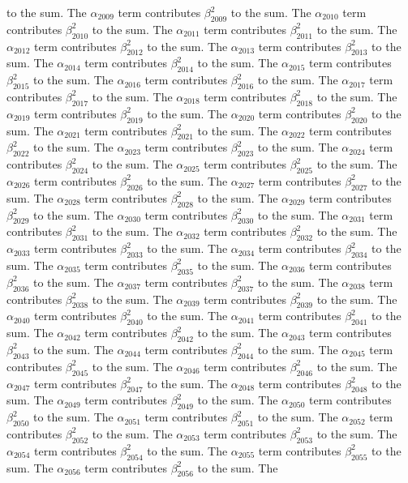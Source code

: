\begin{lemma}
to the sum. The $\alpha_{2009}$ term contributes $\beta_{2009}^{2}$ to the sum. The $\alpha_{2010}$ term contributes $\beta_{2010}^{2}$ to the sum. The $\alpha_{2011}$ term contributes $\beta_{2011}^{2}$ to the sum. The $\alpha_{2012}$ term contributes $\beta_{2012}^{2}$ to the sum. The $\alpha_{2013}$ term contributes $\beta_{2013}^{2}$ to the sum. The $\alpha_{2014}$ term contributes $\beta_{2014}^{2}$ to the sum. The $\alpha_{2015}$ term contributes $\beta_{2015}^{2}$ to the sum. The $\alpha_{2016}$ term contributes $\beta_{2016}^{2}$ to the sum. The $\alpha_{2017}$ term contributes $\beta_{2017}^{2}$ to the sum. The $\alpha_{2018}$ term contributes $\beta_{2018}^{2}$ to the sum. The $\alpha_{2019}$ term contributes $\beta_{2019}^{2}$ to the sum. The $\alpha_{2020}$ term contributes $\beta_{2020}^{2}$ to the sum. The $\alpha_{2021}$ term contributes $\beta_{2021}^{2}$ to the sum. The $\alpha_{2022}$ term contributes $\beta_{2022}^{2}$ to the sum. The $\alpha_{2023}$ term contributes $\beta_{2023}^{2}$ to the sum. The $\alpha_{2024}$ term contributes $\beta_{2024}^{2}$ to the sum. The $\alpha_{2025}$ term contributes $\beta_{2025}^{2}$ to the sum. The $\alpha_{2026}$ term contributes $\beta_{2026}^{2}$ to the sum. The $\alpha_{2027}$ term contributes $\beta_{2027}^{2}$ to the sum. The $\alpha_{2028}$ term contributes $\beta_{2028}^{2}$ to the sum. The $\alpha_{2029}$ term contributes $\beta_{2029}^{2}$ to the sum. The $\alpha_{2030}$ term contributes $\beta_{2030}^{2}$ to the sum. The $\alpha_{2031}$ term contributes $\beta_{2031}^{2}$ to the sum. The $\alpha_{2032}$ term contributes $\beta_{2032}^{2}$ to the sum. The $\alpha_{2033}$ term contributes $\beta_{2033}^{2}$ to the sum. The $\alpha_{2034}$ term contributes $\beta_{2034}^{2}$ to the sum. The $\alpha_{2035}$ term contributes $\beta_{2035}^{2}$ to the sum. The $\alpha_{2036}$ term contributes $\beta_{2036}^{2}$ to the sum. The $\alpha_{2037}$ term contributes $\beta_{2037}^{2}$ to the sum. The $\alpha_{2038}$ term contributes $\beta_{2038}^{2}$ to the sum. The $\alpha_{2039}$ term contributes $\beta_{2039}^{2}$ to the sum. The $\alpha_{2040}$ term contributes $\beta_{2040}^{2}$ to the sum. The $\alpha_{2041}$ term contributes $\beta_{2041}^{2}$ to the sum. The $\alpha_{2042}$ term contributes $\beta_{2042}^{2}$ to the sum. The $\alpha_{2043}$ term contributes $\beta_{2043}^{2}$ to the sum. The $\alpha_{2044}$ term contributes $\beta_{2044}^{2}$ to the sum. The $\alpha_{2045}$ term contributes $\beta_{2045}^{2}$ to the sum. The $\alpha_{2046}$ term contributes $\beta_{2046}^{2}$ to the sum. The $\alpha_{2047}$ term contributes $\beta_{2047}^{2}$ to the sum. The $\alpha_{2048}$ term contributes $\beta_{2048}^{2}$ to the sum. The $\alpha_{2049}$ term contributes $\beta_{2049}^{2}$ to the sum. The $\alpha_{2050}$ term contributes $\beta_{2050}^{2}$ to the sum. The $\alpha_{2051}$ term contributes $\beta_{2051}^{2}$ to the sum. The $\alpha_{2052}$ term contributes $\beta_{2052}^{2}$ to the sum. The $\alpha_{2053}$ term contributes $\beta_{2053}^{2}$ to the sum. The $\alpha_{2054}$ term contributes $\beta_{2054}^{2}$ to the sum. The $\alpha_{2055}$ term contributes $\beta_{2055}^{2}$ to the sum. The $\alpha_{2056}$ term contributes $\beta_{2056}^{2}$ to the sum. The 
\end{lemma}
